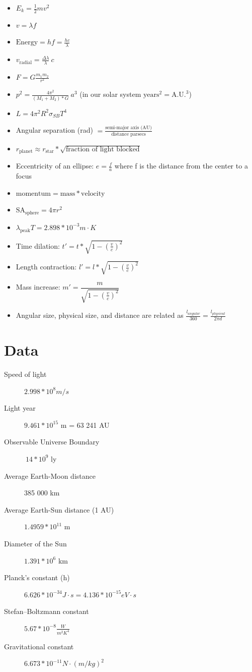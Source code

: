 \documentclass[12pt]{article}
\begin{document}
\begin{itemize}
\item $E_k = \frac{1}{2}mv^2$
\item $v = \lambda f$
\item $\text{Energy} = h f = \frac{hc}{\lambda}$
\item $v_\text{radial} = \frac{\Delta \lambda}{\lambda}\ c$
\item $F = G\frac{m_1 m_2}{r^2}$
\item $p^2 = \frac{4\pi^2}{(M_1 + M_2) * G}\ a^3$ (in our solar system $\text{years}^2 = \text{A.U.}^3$)
\item $L = 4\pi^2R^2 \sigma_{SB} T^4$
\item Angular separation (rad) $= \frac{\text{semi-major axis (AU)}}{\text{distance parsecs}}$
\item $r_\text{planet} \approx r_\text{star} * \sqrt{\text{fraction of light blocked}}$
\item Eccentricity of an ellipse: $e = \frac{f}{a}$ where f is the distance from the center to a focus
\item $\text{momentum} = \text{mass} * \text{velocity}$
\item $\text{SA}_\text{sphere} = 4 \pi r^2$
\item $\lambda_\text{peak} T = 2.898 * 10^{-3} m \cdot K$
\item Time dilation: $t' = t * \sqrt{1 - \left( \frac{v}{c} \right)^2}$
\item Length contraction: $l' = l * \sqrt{1 - \left( \frac{v}{c} \right)^2}$
\item Mass increase: $m' = \dfrac{m}{\sqrt{1 - \left( \frac{v}{c} \right)^2}}$
\item Angular size, physical size, and distance are related as $\frac{l_{angular}}{360} = \frac{l_{physical}}{2\pi d}$
\end{itemize}

\section{Data}
\begin{description}
\item[Speed of light] $2.998 * 10^8 m/s$
\item[Light year] $9.461 * 10^{15}$ m = 63 241 AU
\item[Observable Universe Boundary] $~14 * 10^9$ ly
\item[Average Earth-Moon distance] 385 000 km
\item[Average Earth-Sun distance (1 AU)] $1.4959 * 10^{11}$ m
\item[Diameter of the Sun] $1.391 * 10^6$ km
\item[Planck's constant (h)] $6.626 * 10^{-34} J \cdot s = 4.136 * 10^{-15} eV \cdot s$
\item[Stefan–Boltzmann constant] $5.67 * 10^{-8} \frac{W}{m^2 K^4}$
\item[Gravitational constant] $6.673 * 10^{-11} N \cdot (m/kg)^2$
\end{description}
\end{document}
